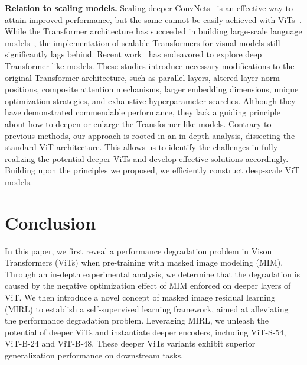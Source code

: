 \documentclass{article}
\begin{document}
 \textbf{Relation to scaling models.}
Scaling deeper ConvNets~\cite{he2016deep,tan2019efficientnet, simonyan2014very,szegedy2015going, srivastava2015highway, szegedy2017inception} is an effective way to attain improved performance, but the same cannot be easily achieved with ViTs~\cite{riquelme2021scaling}. 
While the Transformer architecture has succeeded in building large-scale language models~\cite{chowdhery2022palm, wei2022emergent,t5paper,tay2022unifying,chung2022scaling,fedus2021switch}, 
the implementation of scalable Transformers for visual models still significantly lags behind. 
Recent work~\cite{zhou2021deepvit,lepikhin2020gshard,wang2022deepnet,dehghani2023scaling, zhai2022scaling} has endeavored to explore deep Transformer-like models. These studies introduce necessary modifications to the original Transformer architecture, such as parallel layers, altered layer norm positions, composite attention mechanisms, larger embedding dimensions, unique optimization strategies, and exhaustive hyperparameter searches.
Although they have demonstrated commendable performance, they lack a guiding principle about how to deepen or enlarge the Transformer-like models.
Contrary to previous methods, our approach is rooted in an in-depth analysis, dissecting the standard ViT architecture. This allows us to identify the challenges in fully realizing the potential deeper ViTs and develop effective solutions accordingly. Building upon the principles we proposed, we efficiently construct deep-scale ViT models.







\vspace{5pt}
\section{Conclusion}
\vspace{5pt}
In this paper, we first reveal a performance degradation problem in Vison Transformers (ViTs) when pre-training with masked image modeling (MIM). Through an in-depth experimental analysis, we determine that the degradation is caused by the negative optimization effect of MIM enforced on deeper layers of ViT.
We then introduce a novel concept of masked image residual learning (MIRL) to establish a self-supervised learning framework, aimed at alleviating the performance degradation problem. Leveraging MIRL, we unleash the potential of deeper ViTs and instantiate deeper encoders, including ViT-S-54, ViT-B-24 and ViT-B-48. These deeper ViTs variants exhibit superior generalization performance on downstream tasks. 
\end{document}
